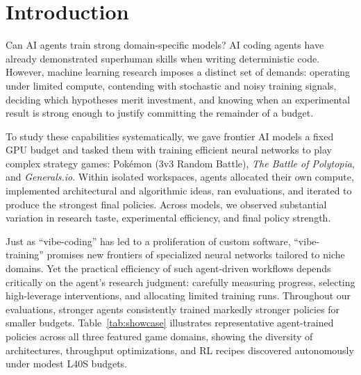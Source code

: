 \documentclass[11pt,letterpaper]{article}
\newcommand{\pokemon}{Pok\'emon}
\begin{document}
\section{Introduction}
\label{sec:intro}

Can AI agents train strong domain-specific models? AI coding agents have already demonstrated superhuman skills when writing deterministic code. However, machine learning research imposes a distinct set of demands: operating under limited compute, contending with stochastic and noisy training signals, deciding which hypotheses merit investment, and knowing when an experimental result is strong enough to justify committing the remainder of a budget.

To study these capabilities systematically, we gave frontier AI models a fixed GPU budget and tasked them with training efficient neural networks to play complex strategy games: \pokemon{} (3v3 Random Battle), \textit{The Battle of Polytopia}, and \textit{Generals.io}. Within isolated workspaces, agents allocated their own compute, implemented architectural and algorithmic ideas, ran evaluations, and iterated to produce the strongest final policies. Across models, we observed substantial variation in research taste, experimental efficiency, and final policy strength.

Just as ``vibe-coding'' has led to a proliferation of custom software, ``vibe-training'' promises new frontiers of specialized neural networks tailored to niche domains. Yet the practical efficiency of such agent-driven workflows depends critically on the agent's research judgment: carefully measuring progress, selecting high-leverage interventions, and allocating limited training runs. Throughout our evaluations, stronger agents consistently trained markedly stronger policies for smaller budgets. Table~\ref{tab:showcase} illustrates representative agent-trained policies across all three featured game domains, showing the diversity of architectures, throughput optimizations, and RL recipes discovered autonomously under modest L40S budgets.
\end{document}
